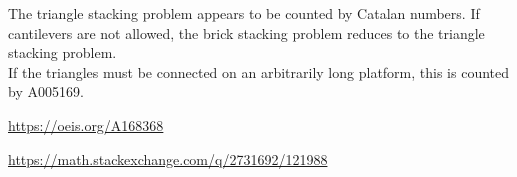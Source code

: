\documentclass{article}
\begin{document}
\begin{note}
  The triangle stacking problem appears to be counted by Catalan numbers.
  If cantilevers are not allowed, the brick stacking problem reduces to the
  triangle stacking problem.\\
  If the triangles must be connected on an arbitrarily long platform, this is
  counted by A005169.
\end{note}
\begin{references}
  \item \url{https://oeis.org/A168368}
  \item \url{https://math.stackexchange.com/q/2731692/121988}
\end{references}
\end{document}
